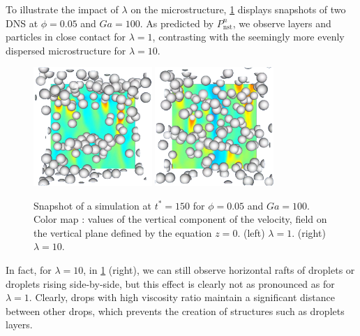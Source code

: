To illustrate the impact of $\lambda$ on the microstructure, \ref{fig:images} displays snapshots of two DNS at $\phi = 0.05$ and $Ga = 100$. 
As predicted by $P_\text{nst}^n$, we observe layers and particles in close contact for $\lambda = 1$, contrasting with the seemingly more evenly dispersed microstructure for $\lambda = 10$.
\begin{figure}[h!]
   \centering
   \includegraphics[width=0.4\textwidth]{image/HOMOGENEOUS_NEW/P_PHI_5_l_10_Ga_100.png}
   \includegraphics[width=0.4\textwidth]{image/HOMOGENEOUS_NEW/P_PHI_5_l_1_Ga_100.png}
   \caption{Snapshot of a simulation at $t^* = 150$ for $\phi=0.05$ and $Ga=100$.
   Color map : values of the vertical component of the velocity, field on the vertical plane defined by the equation $z=0$. 
   (left)  $\lambda = 1$.
   (right)  $\lambda = 10$.
   }
   \label{fig:images}
\end{figure}
In fact, for $\lambda = 10$, in \ref{fig:images} (right), we can still observe horizontal rafts of droplets or droplets rising side-by-side, but this effect is clearly not as pronounced as for $\lambda = 1$. 
Clearly, drops with high viscosity ratio maintain a significant distance between other drops, which prevents the creation of structures such as droplets layers.
